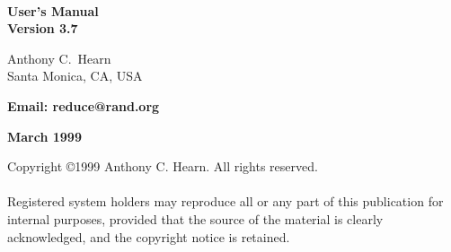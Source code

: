 \vspace*{2.0in}
\begin{center}

{\Huge\bf {\REDUCE}} \\ [0.2cm]
{\LARGE\bf User's Manual\vspace{0.4cm} \\
  Version 3.7}

\vspace{0.5in}\large\bf

Anthony C.\ Hearn \\
Santa Monica, CA, USA

\vspace{0.1in}

\bf Email: reduce@rand.org

\vspace{0.5in}

\large\bf March 1999

\end{center}

\newpage
\vspace*{3.0in}
\noindent Copyright \copyright 1999 Anthony C. Hearn.  All rights reserved. \\
\mbox{}\\
%
\noindent Registered system holders may reproduce all or any part of this
publication for internal purposes, provided that the source of the
material is clearly acknowledged, and the copyright notice is retained.

\pagestyle{headings}

